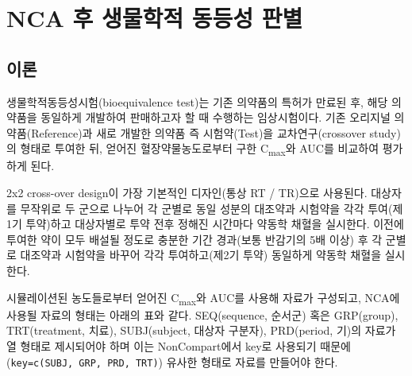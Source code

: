 \documentclass[
  11pt,
  krantz2, a4paper, twoside]{krantz}
\theoremstyle{definition}
\theoremstyle{definition}
\theoremstyle{definition}
\theoremstyle{definition}
\theoremstyle{remark}
\begin{document}
\section{NCA 후 생물학적 동등성 판별}\label{bioequivalence}

\subsection{이론}\label{uxc774uxb860}

생물학적동등성시험(bioequivalence test)는 기존 의약품의 특허가 만료된 후, 해당 의약품을 동일하게 개발하여 판매하고자 할 때 수행하는 임상시험이다.
기존 오리지널 의약품(Reference)과 새로 개발한 의약품 즉 시험약(Test)을 교차연구(crossover study)의 형태로 투여한 뒤, 얻어진 혈장약물농도로부터 구한 C\textsubscript{max}와 AUC를 비교하여 평가하게 된다.

2x2 cross-over design이 가장 기본적인 디자인(통상 RT / TR)으로 사용된다. 대상자를 무작위로 두 군으로 나누어 각 군별로 동일 성분의 대조약과 시험약을 각각 투여(제1기 투약)하고 대상자별로 투약 전후 정해진 시간마다 약동학 채혈을 실시한다. 이전에 투여한 약이 모두 배설될 정도로 충분한 기간 경과(보통 반감기의 5배 이상) 후 각 군별로 대조약과 시험약을 바꾸어 각각 투여하고(제2기 투약) 동일하게 약동학 채혈을 실시한다. 

시뮬레이션된 농도들로부터 얻어진 C\textsubscript{max}와 AUC를 사용해 자료가 구성되고, NCA에 사용될 자료의 형태는 아래의 표와 같다. SEQ(sequence, 순서군) 혹은 GRP(group), TRT(treatment, 치료), SUBJ(subject, 대상자 구분자), PRD(period, 기)의 자료가 열 형태로 제시되어야 하며 이는 NonCompart에서 key로 사용되기 때문에(\texttt{key=c(\textquotesingle{}SUBJ\textquotesingle{},\ \textquotesingle{}GRP\textquotesingle{},\ \textquotesingle{}PRD\textquotesingle{},\ \textquotesingle{}TRT\textquotesingle{})}) 유사한 형태로 자료를 만들어야 한다. 
\end{document}
